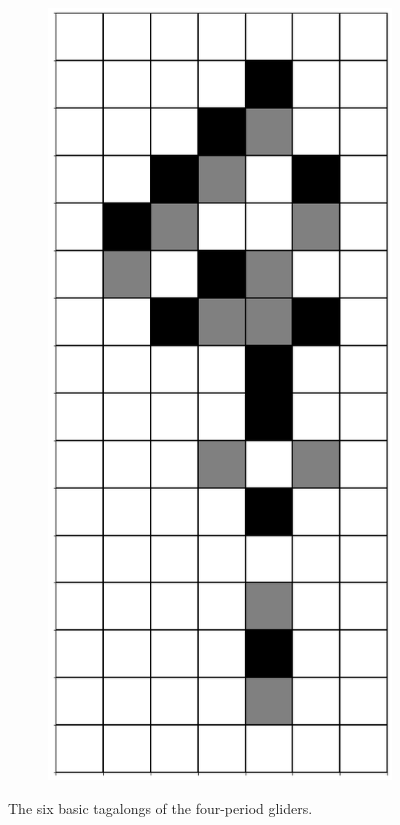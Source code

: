 \documentclass[12pt]{article}
\numberwithin{figure}{section} %
\begin{document}
\begin{figure}[H]
\begin{subfigure}{0.16\textwidth}
     		\includegraphics[width=\linewidth]{Section4/21.5}
     	\subcaption{}
   	\end{subfigure}
      	\newline
   	\setcounter{subfigure}{0}
	\caption[Tagalongs of four-period gliders]{The six basic tagalongs of the four-period gliders.}
	\label{fig:tagalongs of four-period gliders}
\end{figure}
\end{document}
